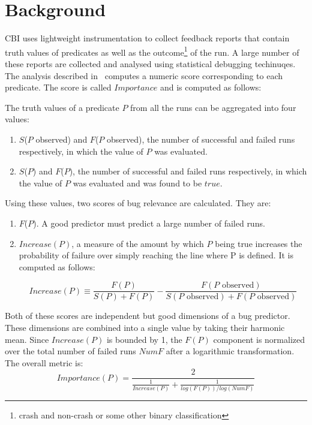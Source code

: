 \section{Background}
\label{sec-bground}
CBI uses lightweight instrumentation to collect feedback reports that contain truth values of predicates as well as the outcome{\footnote{crash and non-crash or some other binary classification}} of the run.  A large number of these reports are collected and analysed using statistical debugging techinuqes.  The analysis described in~\cite{Liblit:2005:SSBI} computes a numeric score corresponding to each predicate.  The score is called $Importance$ and is computed as follows:

The truth values of a predicate $P$ from all the runs can be aggregated into four values:

\begin{enumerate}
\item $S$($P$ observed) and $F$($P$ observed), the number of successful and failed runs respectively, in which the value of $P$ was evaluated.
\item $S$($P$) and $F$($P$), the number of successful and failed runs respectively, in which the value of $P$ was evaluated and was found to be $true$.
\end{enumerate}

Using these values, two scores of bug relevance are calculated.  They are:
\begin{enumerate}
\item $F$($P$).  A good predictor must predict a large number of failed runs.
\item $Increase(P)$, a measure of the amount by which $P$ being true increases the probability of failure over simply reaching the line where P is defined.  It is computed as follows:

\begin{equation}
\label{eqn1}
Increase(P) \equiv 
\frac{F(P)}{S(P) + F(P)}
-
\frac{F(\text{$P$ observed})}{S(\text{$P$ observed}) +
  F(\text{$P$ observed})}
\end{equation}
\end{enumerate}

Both of these scores are independent but good dimensions of a bug predictor.  These dimensions are combined into a single value by taking their harmonic mean.  Since $Increase(P)$ is bounded by 1, the $F(P)$ component is normalized over the total number of failed runs $NumF$ after a logarithmic transformation.  The overall metric is:
\begin{equation}
\label{eqn2}
Importance(P) =
\frac{2}{
  \frac{1}{Increase(P)}
  +
  \frac{1}{log(F(P)) / log(NumF)}}
\end{equation}

